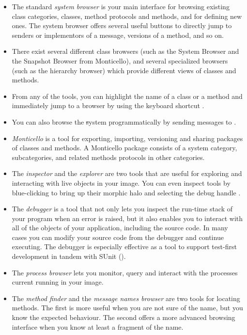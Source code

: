\documentclass[a4paper,10pt,twoside]{book}
\begin{document}
\begin{itemize}
  \item The standard \emph{system browser} is your main interface for browsing existing class categories, classes, method protocols and methods, and for defining new ones.
  The system browser offers several useful buttons to directly jump to senders or implementors of a message, versions of a method, and so on.
  \item There exist several different class browsers (such as the System Browser and the Snapshot Browser from Monticello), and several specialized browsers (such as the hierarchy browser) which provide different views of classes and methods.
  \item From any of the tools, you can highlight the name of a class or a method and immediately jump to a browser by using the keyboard shortcut .
  \item You can also browse the \st system programmatically by sending messages to .
  \item \emph{Monticello} is a tool for exporting, importing, versioning and sharing packages of classes and methods.
  A Monticello package consists of a system category, subcategories, and related methods protocols in other categories.
  \item The \emph{inspector} and the \emph{explorer} are two tools that are useful for exploring and interacting with live objects in your image.
  You can even inspect tools by blue-clicking to bring up their morphic halo and selecting the debug handle \debugHandle.
  \item The \emph{debugger} is a tool that not only lets you inspect the run-time stack of your program when an error is raised, but it also enables you to interact with all of the objects of your application, including the source code. In many cases you can modify your source code from the debugger and continue executing. The debugger is especially effective as a tool to support test-first development in tandem with SUnit ().
  \item The \emph{process browser} lets you monitor, query and interact with the processes current running in your image.
  \item The \emph{method finder} and the \emph{message names browser} are two tools for locating methods. The first is more useful when you are not sure of the name, but you know the expected behaviour. The second offers a more advanced browsing interface when you know at least a fragment of the name.

\end{itemize}
\end{document}
